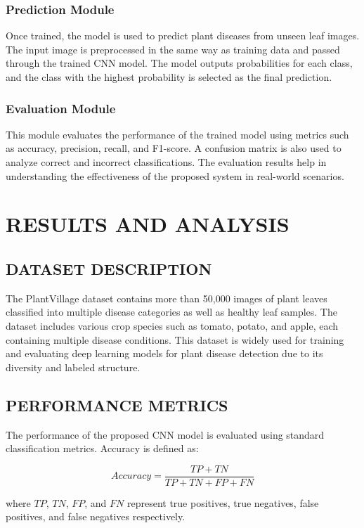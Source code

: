 \documentclass[12pt]{report}
\begin{document}
\subsection{Prediction Module}
Once trained, the model is used to predict plant diseases from unseen leaf images. The input image is preprocessed in the same way as training data and passed through the trained CNN model. The model outputs probabilities for each class, and the class with the highest probability is selected as the final prediction.

\subsection{Evaluation Module}
This module evaluates the performance of the trained model using metrics such as accuracy, precision, recall, and F1-score. A confusion matrix is also used to analyze correct and incorrect classifications. The evaluation results help in understanding the effectiveness of the proposed system in real-world scenarios.

\chapter{RESULTS AND ANALYSIS}

\section{DATASET DESCRIPTION}
The PlantVillage dataset contains more than 50,000 images of plant leaves classified into multiple disease categories as well as healthy leaf samples. The dataset includes various crop species such as tomato, potato, and apple, each containing multiple disease conditions. This dataset is widely used for training and evaluating deep learning models for plant disease detection due to its diversity and labeled structure.

\section{PERFORMANCE METRICS}
The performance of the proposed CNN model is evaluated using standard classification metrics. Accuracy is defined as:

\begin{equation}
Accuracy = \frac{TP + TN}{TP + TN + FP + FN}
\end{equation}

where $TP$, $TN$, $FP$, and $FN$ represent true positives, true negatives, false positives, and false negatives respectively.
\end{document}

